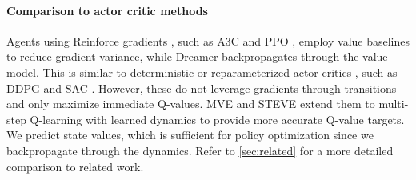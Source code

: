\paragraph{Comparison to actor critic methods}

Agents using Reinforce gradients \citep{williams1992reinforce}, such as A3C and PPO \citep{mnih2016a3c,schulman2017ppo}, employ value baselines to reduce gradient variance, while Dreamer backpropagates through the value model. This is similar to deterministic or reparameterized actor critics \citep{silver2014dpg}, such as DDPG and SAC \citep{lillicrap2015ddpg,haarnoja2018sac}. However, these do not leverage gradients through transitions and only maximize immediate Q-values. MVE and STEVE \citep{feinberg2018mve,buckman2018steve} extend them to multi-step Q-learning with learned dynamics to provide more accurate Q-value targets. We predict state values, which is sufficient for policy optimization since we backpropagate through the dynamics. Refer to \cref{sec:related} for a more detailed comparison to related work.